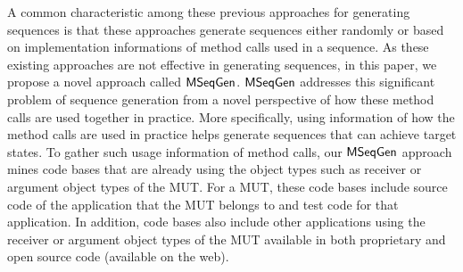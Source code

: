 A common characteristic among these previous approaches for generating sequences is that these approaches generate sequences either randomly or based on implementation informations of method calls used in a sequence. As these existing approaches are not effective in generating sequences, in this paper, we propose a novel approach called $\textsf{MSeqGen} $. $\textsf{MSeqGen} $ addresses this significant problem of sequence generation from a novel perspective of how these method calls are used together in practice. More specifically, using information of how the method calls are used in practice helps generate sequences that can achieve target states. To gather such usage information of method calls, our $\textsf{MSeqGen} $ approach mines code bases that are already using the object types such as receiver or argument object types of the MUT. For a MUT, these code bases include source code of the application that the MUT belongs to and test code for that application. In addition, code bases also include other applications using the receiver or argument object types of the MUT available in both proprietary and open source code (available on the web). 

